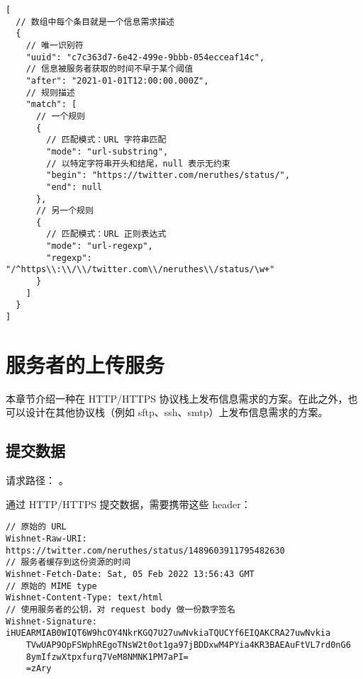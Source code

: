 \documentclass[a4paper,11pt]{article}
\newcommand{\inlinecode}[1]{
    {\fbox{\small\ttfamily{#1}}}
}
\begin{document}
\begin{lstlisting}
[
  // 数组中每个条目就是一个信息需求描述
  {
    // 唯一识别符
    "uuid": "c7c363d7-6e42-499e-9bbb-054ecceaf14c",
    // 信息被服务者获取的时间不早于某个阈值
    "after": "2021-01-01T12:00:00.000Z",
    // 规则描述
    "match": [
      // 一个规则
      {
        // 匹配模式：URL 字符串匹配
        "mode": "url-substring",
        // 以特定字符串开头和结尾，null 表示无约束
        "begin": "https://twitter.com/neruthes/status/",
        "end": null
      },
      // 另一个规则
      {
        // 匹配模式：URL 正则表达式
        "mode": "url-regexp",
        "regexp": "/^https\\:\\/\\/twitter.com\\/neruthes\\/status/\w+"
      }
    ]
  }
]
\end{lstlisting}












\section{服务者的上传服务}

本章节介绍一种在 HTTP/HTTPS 协议栈上发布信息需求的方案。在此之外，也可以设计在其他协议栈（例如 sftp、ssh、smtp）上发布信息需求的方案。

\subsection{提交数据}

请求路径：\inlinecode{POST /api/submit/(uuid)}。

通过 HTTP/HTTPS 提交数据，需要携带这些 header：

\begin{lstlisting}
// 原始的 URL
Wishnet-Raw-URI: https://twitter.com/neruthes/status/1489603911795482630
// 服务者缓存到这份资源的时间
Wishnet-Fetch-Date: Sat, 05 Feb 2022 13:56:43 GMT
// 原始的 MIME type
Wishnet-Content-Type: text/html
// 使用服务者的公钥，对 request body 做一份数字签名
Wishnet-Signature: iHUEARMIAB0WIQT6W9hcOY4NkrKGQ7U27uwNvkiaTQUCYf6EIQAKCRA27uwNvkia
    TVwUAP9OpFSWphREgoTNsW2t0ot1ga97jBDDxwM4PYia4KR3BAEAuFtVL7rd0nG6
    8ymIfzwXtpxfurq7VeM8NMNK1PM7aPI=
    =zAry
\end{lstlisting}
\end{document}
